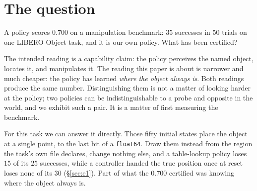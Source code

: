 \documentclass[10pt,twocolumn]{article}
\begin{document}
\begin{abstract}
\textbf{What verification did not catch.} Along the way we made nine errors,
\emph{most} found by adversarial review rather than by us --- and the word is
``most'' deliberately, because at least one was caught by our own validation
and writing ``each'' would be a chosen slice inside the section about chosen
slices (\S\ref{sec:neg}). \textbf{Not one was a wrong
computation.} Each was a decision about which slice of a correct instrument's
output got written down: which trials had finished, which axes were compared,
which tolerances were swept, which of two estimates was quoted, which parts of
the document a retraction reached. Our verifier recomputes every number in the
load-bearing sections from raw outcomes --- and it passed, at the $76$ checks
it carried then and would still pass at the $206$ it carries now, while the
central claim it certified was false, because it recomputed the
two-dimensional distance we had chosen to compute. \textbf{All nine ran in the
direction that flattered us.} We give the taxonomy, the artifacts, and the
review process that produced it, because a field that checks arithmetic is
defended against none of this.
\end{abstract}

\section{The question}

A policy scores $0.700$ on a manipulation benchmark: $35$ successes in $50$
trials on one LIBERO-Object task, and it is our own policy. What has been
certified?

The intended reading is a capability claim: the policy perceives the named
object, locates it, and manipulates it. The reading this paper is about is
narrower and much cheaper: the policy has learned \emph{where the object always
is}. Both readings produce the same number. Distinguishing them is not a matter
of looking harder at the policy; two policies can be indistinguishable to a
probe and opposite in the world, and we exhibit such a pair. It is a matter of
first measuring the benchmark.

For this task we can answer it directly. Those fifty initial states place the
object at a single point, to the last bit of a \texttt{float64}. Draw them
instead from the region the task's own file declares, change nothing else, and
a table-lookup policy loses $15$ of its $25$ successes, while a controller
handed the true position once at reset loses none of its $30$
(\S\ref{sec:e1}). Part of what the $0.700$ certified was knowing where the
object always is.
\end{document}
